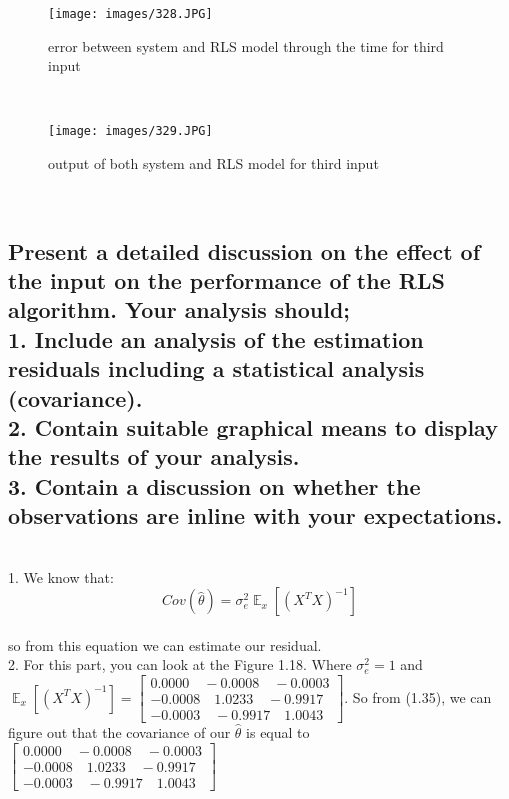 \documentclass[11pt]{scrartcl} %
\begin{document}
\begin{figure}[H]
	\centering
	\texttt{[image: images/328.JPG]}
	\caption{error between system and RLS model through the time for third input}
\end{figure}\\

\begin{figure}[H]
	\centering
	\texttt{[image: images/329.JPG]}
	\caption{output of both system and RLS model for third input}
\end{figure}\\
\subsection{Present a detailed discussion on the effect of the input on the performance of the RLS algorithm. Your analysis should;\\
1. Include an analysis of the estimation residuals including a statistical analysis (covariance).\\
2. Contain suitable graphical means to display the results of your analysis.\\
3. Contain a discussion on whether the observations are inline with your expectations.}\\

1. We know that:
\begin{equation}Cov(\hat{\theta})=\sigma_e^2\mathop{\mathbb{E}}_x[(X^TX)^{-1}]\end{equation}\\

so from this equation we can estimate our residual.\\


2. For this part, you can look at the Figure 1.18. Where $\sigma_e^2 = 1$ and\\ $\mathop{\mathbb{E}}_x[(X^TX)^{-1}] = \left[\begin{array}{l}
0.0000 \quad -0.0008 \quad -0.0003 \\
-0.0008 \quad 1.0233 \quad -0.9917 \\
-0.0003 \quad -0.9917 \quad 1.0043
\end{array}\right]$. So from (1.35), we can figure out that the covariance of our $\hat{\theta}$ is equal to $\left[\begin{array}{l}
0.0000 \quad -0.0008 \quad -0.0003 \\
-0.0008 \quad 1.0233 \quad -0.9917 \\
-0.0003 \quad -0.9917 \quad 1.0043
\end{array}\right]$\\
\end{document}
